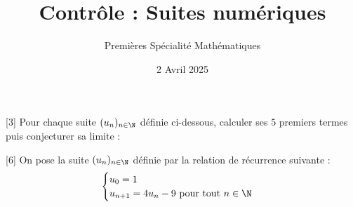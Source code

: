 \documentclass{exam}
\title{Contrôle : Suites numériques}
\date{2 Avril 2025}
\author{Premières Spécialité Mathématiques}
\begin{document}
\maketitle
{}
\begin{questions}
[3]
Pour chaque suite $(u_n)_{n \in \N}$ définie ci-dessous, calculer ses $5$ premiers termes puis conjecturer sa limite :
\vspace*{0.5cm}
[6]
On pose la suite $(u_n)_{n \in \N}$ définie par la relation de récurrence suivante :
\begin{equation*}
\begin{cases}
u_0 = 1\\
u_{n+1} = 4u_n - 9 \text{ pour tout } n \in \N
\end{cases}
\end{equation*}
\end{questions}
\end{document}
